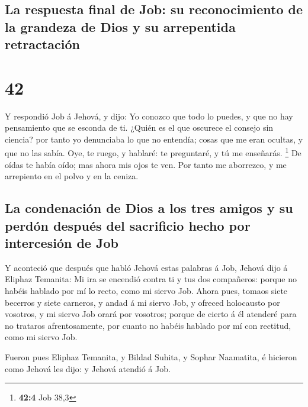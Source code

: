 \hypertarget{la-respuesta-final-de-job-su-reconocimiento-de-la-grandeza-de-dios-y-su-arrepentida-retractaciuxf3n}{%
\subsection{La respuesta final de Job: su reconocimiento de la grandeza
de Dios y su arrepentida
retractación}\label{la-respuesta-final-de-job-su-reconocimiento-de-la-grandeza-de-dios-y-su-arrepentida-retractaciuxf3n}}

\hypertarget{section-41}{%
\section{42}\label{section-41}}

 Y respondió Job á Jehová, y dijo:  Yo conozco
que todo lo puedes, y que no hay pensamiento que se esconda de ti.
 ¿Quién es el que oscurece el consejo sin ciencia? por tanto
yo denunciaba lo que no entendía; cosas que me eran ocultas, y que no
las sabía.  Oye, te ruego, y hablaré: te preguntaré, y tú me
enseñarás. \footnote{\textbf{42:4} Job 38,3}  De oídas te
había oído; mas ahora mis ojos te ven.  Por tanto me
aborrezco, y me arrepiento en el polvo y en la ceniza.

\hypertarget{la-condenaciuxf3n-de-dios-a-los-tres-amigos-y-su-perduxf3n-despuuxe9s-del-sacrificio-hecho-por-intercesiuxf3n-de-job}{%
\subsection{La condenación de Dios a los tres amigos y su perdón después
del sacrificio hecho por intercesión de
Job}\label{la-condenaciuxf3n-de-dios-a-los-tres-amigos-y-su-perduxf3n-despuuxe9s-del-sacrificio-hecho-por-intercesiuxf3n-de-job}}

 Y aconteció que después que habló Jehová estas palabras á
Job, Jehová dijo á Eliphaz Temanita: Mi ira se encendió contra ti y tus
dos compañeros: porque no habéis hablado por mí lo recto, como mi siervo
Job.  Ahora pues, tomaos siete becerros y siete carneros, y
andad á mi siervo Job, y ofreced holocausto por vosotros, y mi siervo
Job orará por vosotros; porque de cierto á él atenderé para no trataros
afrentosamente, por cuanto no habéis hablado por mí con rectitud, como
mi siervo Job.

 Fueron pues Eliphaz Temanita, y Bildad Suhita, y Sophar
Naamatita, é hicieron como Jehová les dijo: y Jehová atendió á Job.


